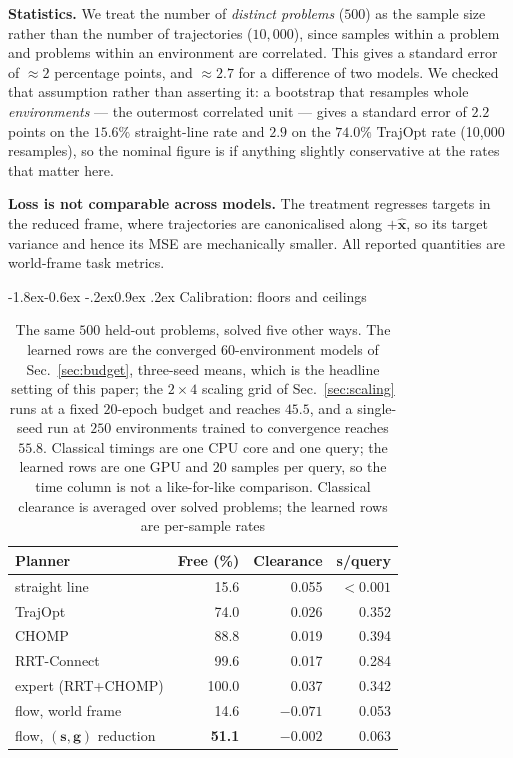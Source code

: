 \documentclass[10pt,twocolumn,letterpaper]{article}
\makeatletter
\newcommand{\toprule}{\hline}
\newcommand{\midrule}{\hline}
\newcommand{\bottomrule}{\hline}
\renewcommand\subsection{\@startsection{subsection}{2}{\z@}%
  {-1.8ex\@plus -0.6ex \@minus -.2ex}{0.9ex \@plus .2ex}%
  {\normalfont\normalsize\bfseries}}
\theoremstyle{plain}
\newcommand{\xhat}{\hat{\mathbf{x}}}
\newcommand{\svec}{\mathbf{s}}
\newcommand{\gvec}{\mathbf{g}}
\makeatother
\begin{document}
\textbf{Statistics.} We treat the number of \emph{distinct problems} ($500$) as
the sample size rather than the number of trajectories ($10{,}000$), since samples
within a problem and problems within an environment are correlated. This gives a
standard error of $\approx 2$ percentage points, and $\approx 2.7$ for a
difference of two models. We checked that assumption rather than asserting it: a
bootstrap that resamples whole \emph{environments} --- the outermost correlated
unit --- gives a standard error of $2.2$ points on the $15.6\%$ straight-line rate
and $2.9$ on the $74.0\%$ TrajOpt rate (10{,}000 resamples), so the nominal figure
is if anything slightly conservative at the rates that matter here.

\textbf{Loss is not comparable across models.} The treatment regresses targets in
the reduced frame, where trajectories are canonicalised along $+\xhat$, so its
target variance and hence its MSE are mechanically smaller. All reported
quantities are world-frame task metrics.

\subsection{Calibration: floors and ceilings}
\label{sec:baselines}

\begin{table}[t]
\centering
\footnotesize
\setlength{\tabcolsep}{3.5pt}
\begin{tabular}{lrrr}
\toprule
Planner & Free (\%) & Clearance & s/query \\
\midrule
straight line                   & 15.6 & 0.055 & $<0.001$ \\
TrajOpt                         & 74.0 & 0.026 & 0.352 \\
CHOMP                           & 88.8 & 0.019 & 0.394 \\
RRT-Connect                     & 99.6 & 0.017 & 0.284 \\
expert (RRT+CHOMP)              & 100.0 & 0.037 & 0.342 \\
\midrule
flow, world frame               & 14.6 & $-0.071$ & 0.053 \\
flow, $(\svec,\gvec)$ reduction & \textbf{51.1} & $-0.002$ & 0.063 \\
\bottomrule
\end{tabular}
\caption{The same $500$ held-out problems, solved five other ways. The learned
rows are the converged $60$-environment models of Sec.~\ref{sec:budget}, three-seed
means, which is the headline setting of this paper; the $2\times4$ scaling grid
of Sec.~\ref{sec:scaling} runs at a fixed $20$-epoch budget and reaches $45.5$,
and a single-seed run at $250$ environments trained to convergence reaches
$55.8$. Classical
timings are one CPU core and one query; the learned rows are one GPU and $20$
samples per query, so the time column is not a like-for-like comparison.
Classical clearance is averaged over solved problems; the learned rows are
per-sample rates}
\label{tab:baselines}
\end{table}
\end{document}
